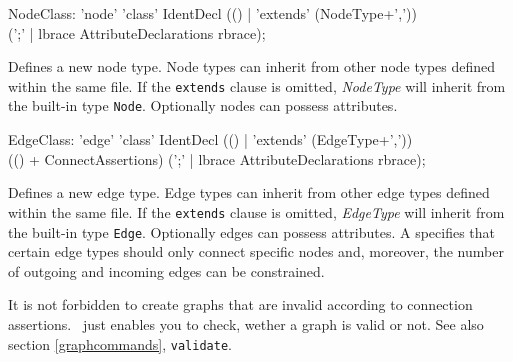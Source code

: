\begin{rail}  
  NodeClass: 'node' 'class' IdentDecl (() | 'extends' (NodeType+',')) \\ 
    (';' | lbrace AttributeDeclarations rbrace);
\end{rail}
Defines a new node type. Node types can inherit from other node types defined within the same file. If the \texttt{extends} clause is omitted, \emph{NodeType} will inherit from the built-in type \texttt{Node}. Optionally nodes can possess attributes.

\begin{rail}    
  EdgeClass: 'edge' 'class' IdentDecl (() | 'extends' (EdgeType+',')) \\
    (() + ConnectAssertions) (';' | lbrace AttributeDeclarations rbrace);
\end{rail}
Defines a new edge type. Edge types can inherit from other edge types defined within the same file. If the \texttt{extends} clause is omitted, \emph{EdgeType} will inherit from the built-in type \texttt{Edge}. Optionally edges can possess attributes. A  specifies that certain edge types should only connect specific nodes and, moreover, the number of outgoing and incoming edges can be constrained.

\begin{note}
It is not forbidden to create graphs that are invalid according to connection assertions. \GrG\ just enables you to check, wether a graph is valid or not. See also section \ref{graphcommands}, \texttt{validate}.
\end{note}

